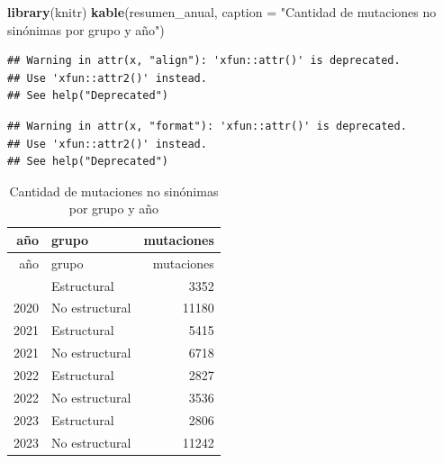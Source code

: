\documentclass[
]{article}
\newenvironment{Shaded}{\begin{snugshade}}{\end{snugshade}}
\newcommand{\AttributeTok}[1]{\textcolor[rgb]{0.13,0.29,0.53}{#1}}
\newcommand{\FunctionTok}[1]{\textcolor[rgb]{0.13,0.29,0.53}{\textbf{#1}}}
\newcommand{\NormalTok}[1]{#1}
\newcommand{\StringTok}[1]{\textcolor[rgb]{0.31,0.60,0.02}{#1}}
\begin{document}
\begin{Shaded}
\begin{Highlighting}[]
\FunctionTok{library}\NormalTok{(knitr)}
\FunctionTok{kable}\NormalTok{(resumen\_anual, }\AttributeTok{caption =} \StringTok{"Cantidad de mutaciones no sinónimas por grupo y año"}\NormalTok{)}
\end{Highlighting}
\end{Shaded}

\begin{verbatim}
## Warning in attr(x, "align"): 'xfun::attr()' is deprecated.
## Use 'xfun::attr2()' instead.
## See help("Deprecated")
\end{verbatim}

\begin{verbatim}
## Warning in attr(x, "format"): 'xfun::attr()' is deprecated.
## Use 'xfun::attr2()' instead.
## See help("Deprecated")
\end{verbatim}

\begin{longtable}[]{@{}rlr@{}}
\caption{Cantidad de mutaciones no sinónimas por grupo y
año}\tabularnewline
\toprule\noalign{}
año & grupo & mutaciones \\
\midrule\noalign{}
\endfirsthead
\toprule\noalign{}
año & grupo & mutaciones \\
\midrule\noalign{}
\endhead
\bottomrule\noalign{}
\endlastfoot
2020 & Estructural & 3352 \\
2020 & No estructural & 11180 \\
2021 & Estructural & 5415 \\
2021 & No estructural & 6718 \\
2022 & Estructural & 2827 \\
2022 & No estructural & 3536 \\
2023 & Estructural & 2806 \\
2023 & No estructural & 11242 \\
\end{longtable}
\end{document}

